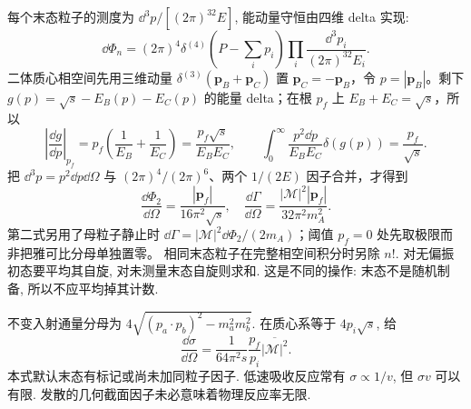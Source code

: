 每个末态粒子的测度为 $\dd^3p/[(2\pi)^32E]$, 能动量守恒由四维 delta 实现:
\begin{equation}
 \dd\Phi_n=(2\pi)^4\delta^{(4)}(P-\sum_i p_i)\prod_i\frac{\dd^3p_i}{(2\pi)^32E_i}.
\end{equation}
二体质心相空间先用三维动量 $\delta^{(3)}(\mathbf p_B+\mathbf p_C)$ 置 $\mathbf p_C=-\mathbf p_B$，令 $p=|\mathbf p_B|$。剩下 $g(p)=\sqrt s-E_B(p)-E_C(p)$ 的能量 delta；在根 $p_f$ 上 $E_B+E_C=\sqrt s$，所以
\begin{equation}
\left|\frac{\dd g}{\dd p}\right|_{p_f}
=p_f\left(\frac1{E_B}+\frac1{E_C}\right)
=\frac{p_f\sqrt s}{E_BE_C},\qquad
\int_0^\infty\frac{p^2\dd p}{E_BE_C}\delta(g(p))
=\frac{p_f}{\sqrt s}.
\end{equation}
把 $\dd^3p=p^2\dd p\dd\Omega$ 与 $(2\pi)^4/(2\pi)^6$、两个 $1/(2E)$ 因子合并，才得到
\begin{equation}
 \frac{\dd\Phi_2}{\dd\Omega}=\frac{|\mathbf p_f|}{16\pi^2\sqrt s},\quad
 \frac{\dd\Gamma}{\dd\Omega}=\frac{|\mathcal M|^2|\mathbf p_f|}{32\pi^2m_A^2}.
\end{equation}
第二式另用了母粒子静止时 $\dd\Gamma=|\mathcal M|^2\dd\Phi_2/(2m_A)$；阈值 $p_f=0$ 处先取极限而非把雅可比分母单独置零。
相同末态粒子在完整相空间积分时另除 $n!$. 对无偏振初态要平均其自旋, 对未测量末态自旋则求和. 这是不同的操作: 末态不是随机制备, 所以不应平均掉其计数.

不变入射通量分母为 $4\sqrt{(p_a\cdot p_b)^2-m_a^2m_b^2}$. 在质心系等于 $4p_i\sqrt s$, 给
\begin{equation}\label{eq:cmcross}
 \frac{\dd\sigma}{\dd\Omega}=\frac1{64\pi^2s}\frac{p_f}{p_i}\overline{|\mathcal M|^2}.
\end{equation}
本式默认末态有标记或尚未加同粒子因子. 低速吸收反应常有 $\sigma\propto1/v$, 但 $\sigma v$ 可以有限. 发散的几何截面因子未必意味着物理反应率无限.
